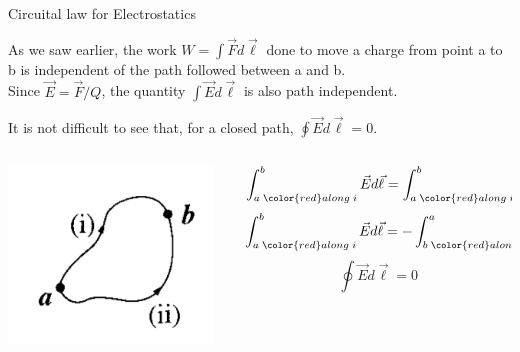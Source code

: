 %
%
%

\begin{frame}{Circuital law for Electrostatics}

As we saw earlier, the work $W = \int \vec{F} d\vec{\ell}$
done to move a charge from point a to b is independent of the path followed between a and b.\\
\vspace{0.2cm}
Since $\vec{E} = \vec{F}/Q$, the quantity $\int \vec{E} d\vec{\ell}$ is also path independent.\\
\vspace{0.2cm}

It is not difficult to see that, for a closed path, $\oint \vec{E} d\vec{\ell} = 0$.\\
\vspace{0.3cm}

\begin{columns}
  \begin{column}{0.35\textwidth}
   \begin{center}
     \includegraphics[width=0.95\textwidth]{./images/schematics/closed_path_integral_of_electric_field_is_0.png}
   \end{center}
  \end{column}
  \begin{column}{0.65\textwidth}
    \begin{equation*}
       \int_{a\;{\color{red}along\;i}}^{b} \vec{E} d\vec{\ell} = \int_{a\;{\color{red}along\;ii}}^{b} \vec{E} d\vec{\ell} \Rightarrow
    \end{equation*}
    \begin{equation*}
       \int_{a\;{\color{red}along\;i}}^{b} \vec{E} d\vec{\ell} = - \int_{b\;{\color{red}along\;ii}}^{a} \vec{E} d\vec{\ell} \Rightarrow
    \end{equation*}
    \begin{equation*}
       \oint \vec{E} d\vec{\ell} = 0
    \end{equation*}
  \end{column}
\end{columns}

\end{frame}


